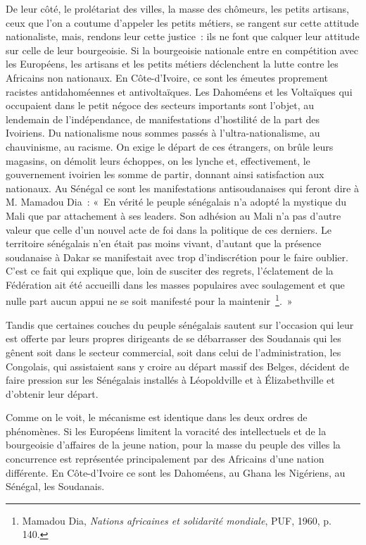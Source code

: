 \documentclass[french,twoside]{book} %
\begin{document}
De leur côté, le prolétariat des villes, la masse des chômeurs, les petits artisans, ceux que l’on a coutume d’appeler les petits métiers, se rangent sur cette attitude nationaliste, mais, rendons leur cette justice : ils ne font que calquer leur attitude sur celle de leur bourgeoisie. Si la bourgeoisie nationale entre en compétition avec les Européens, les artisans et les petits métiers déclenchent la lutte contre les Africains non nationaux. En Côte-d’Ivoire, ce sont les émeutes proprement racistes antidahoméennes et antivoltaïques. Les Dahoméens et les   Voltaïques qui occupaient dans le petit négoce des secteurs importants sont l’objet, au lendemain de l’indépendance, de manifestations d’hostilité de la part des Ivoiriens. Du nationalisme nous sommes passés à l’ultra-nationalisme, au chauvinisme, au racisme. On exige le départ de ces étrangers, on brûle leurs magasins, on démolit leurs échoppes, on les lynche et, effectivement, le gouvernement ivoirien les somme de partir, donnant ainsi satisfaction aux nationaux. Au Sénégal ce sont les manifestations antisoudanaises qui feront dire à M. Mamadou Dia : « En vérité le peuple sénégalais n’a adopté la mystique du Mali que par attachement à ses leaders. Son adhésion au Mali n’a pas d’autre valeur que celle d’un nouvel acte de foi dans la politique de ces derniers. Le territoire sénégalais n’en était pas moins vivant, d’autant que la présence soudanaise à Dakar se manifestait avec trop d’indiscrétion pour le faire oublier. C’est ce fait qui explique que, loin de susciter des regrets, l’éclatement de la Fédération ait été accueilli dans les masses populaires avec soulagement et que nulle part aucun appui ne se soit manifesté pour la maintenir \footnote{Mamadou Dia, \emph{Nations africaines et solidarité mondiale}, PUF, 1960, p. 140.}. »\par
Tandis que certaines couches du peuple sénégalais sautent sur l’occasion qui leur est offerte par leurs propres dirigeants de se débarrasser des Soudanais qui les gênent soit dans le secteur commercial, soit dans celui de l’administration, les Congolais, qui assistaient sans y croire au départ massif des Belges, décident de faire pression sur les Sénégalais installés à Léopoldville et à Élizabethville et d’obtenir leur départ.\par
Comme on le voit, le mécanisme est identique dans les deux ordres de phénomènes. Si les Européens limitent la voracité des intellectuels et de la bourgeoisie d’affaires de la jeune nation, pour la masse du peuple des villes la concurrence est représentée principalement par des Africains d’une nation différente. En Côte-d’Ivoire ce sont les Dahoméens, au Ghana les Nigériens, au Sénégal, les Soudanais.\par
\end{document}
